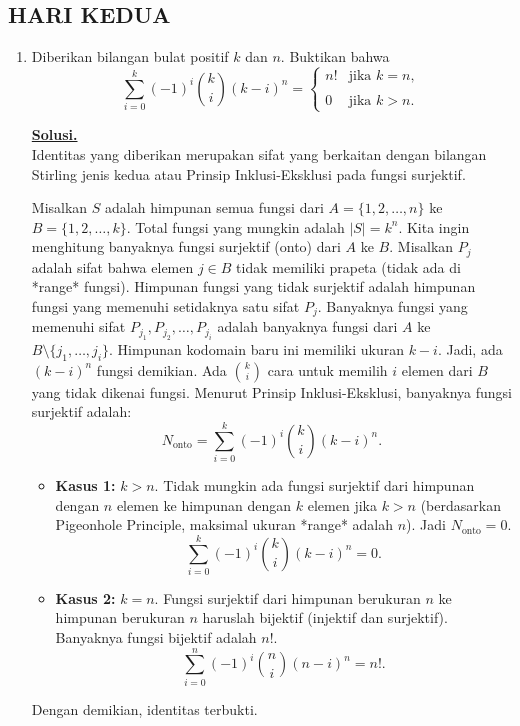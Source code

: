 \documentclass[12pt,twoside]{article}
\newenvironment{solution}
{
	\par\noindent\textbf{\underline{Solusi.}}\\
}
{
	\par
}
\begin{document}
\subsection{HARI KEDUA}
\begin{enumerate}
  \item Diberikan bilangan bulat positif $k$ dan $n$. Buktikan bahwa
        \[
          \sum_{i=0}^{k} (-1)^i \binom{k}{i} (k - i)^n =
          \begin{cases}
            n! & \text{jika } k = n, \\\\
            0  & \text{jika } k > n.
          \end{cases}
        \]

        \begin{solution}
          Identitas yang diberikan merupakan sifat yang berkaitan dengan bilangan Stirling jenis kedua atau Prinsip Inklusi-Eksklusi pada fungsi surjektif.

          Misalkan $S$ adalah himpunan semua fungsi dari $A = \{1, 2, \dots, n\}$ ke $B = \{1, 2, \dots, k\}$. Total fungsi yang mungkin adalah $|S| = k^n$.
          Kita ingin menghitung banyaknya fungsi surjektif (onto) dari $A$ ke $B$. Misalkan $P_j$ adalah sifat bahwa elemen $j \in B$ tidak memiliki prapeta (tidak ada di *range* fungsi). Himpunan fungsi yang tidak surjektif adalah himpunan fungsi yang memenuhi setidaknya satu sifat $P_j$.
          Banyaknya fungsi yang memenuhi sifat $P_{j_1}, P_{j_2}, \dots, P_{j_i}$ adalah banyaknya fungsi dari $A$ ke $B \setminus \{j_1, \dots, j_i\}$. Himpunan kodomain baru ini memiliki ukuran $k - i$. Jadi, ada $(k - i)^n$ fungsi demikian.
          Ada $\binom{k}{i}$ cara untuk memilih $i$ elemen dari $B$ yang tidak dikenai fungsi.
          Menurut Prinsip Inklusi-Eksklusi, banyaknya fungsi surjektif adalah:
          \[ N_{\text{onto}} = \sum_{i=0}^{k} (-1)^i \binom{k}{i} (k - i)^n. \]
          \begin{itemize}
            \item \textbf{Kasus 1:} $k > n$.
                  Tidak mungkin ada fungsi surjektif dari himpunan dengan $n$ elemen ke himpunan dengan $k$ elemen jika $k > n$ (berdasarkan Pigeonhole Principle, maksimal ukuran *range* adalah $n$). Jadi $N_{\text{onto}} = 0$.
                  \[ \sum_{i=0}^{k} (-1)^i \binom{k}{i} (k - i)^n = 0. \]

            \item \textbf{Kasus 2:} $k = n$.
                  Fungsi surjektif dari himpunan berukuran $n$ ke himpunan berukuran $n$ haruslah bijektif (injektif dan surjektif). Banyaknya fungsi bijektif adalah $n!$.
                  \[ \sum_{i=0}^{n} (-1)^i \binom{n}{i} (n - i)^n = n!. \]
          \end{itemize}
          Dengan demikian, identitas terbukti.
        \end{solution}


\end{enumerate}
\end{document}
